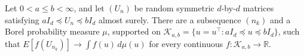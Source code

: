 Let \(0<a\le b<\infty\), and let \((U_n)\) be random symmetric \(d\)-by-\(d\) matrices satisfying \(aI_d\preceq U_n\preceq bI_d\) almost surely. There are a subsequence \((n_k)\) and a Borel probability measure \(\mu\), supported on \(\mathcal K_{a,b}=\{u=u^\top:aI_d\preceq u\preceq bI_d\}\), such that \(E[f(U_{n_k})]\to\int f(u)\,d\mu(u)\) for every continuous \(f:\mathcal K_{a,b}\to\mathbb R\).